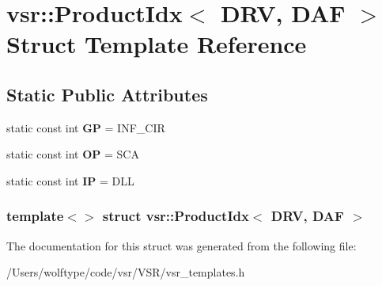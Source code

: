 \hypertarget{structvsr_1_1_product_idx_3_01_d_r_v_00_01_d_a_f_01_4}{\section{vsr\-:\-:Product\-Idx$<$ D\-R\-V, D\-A\-F $>$ Struct Template Reference}
\label{structvsr_1_1_product_idx_3_01_d_r_v_00_01_d_a_f_01_4}
}
\subsection*{Static Public Attributes}
\begin{DoxyCompactItemize}
\item 
\hypertarget{structvsr_1_1_product_idx_3_01_d_r_v_00_01_d_a_f_01_4_a6ec5d5bef01c3942c092f72db9c722e5}{static const int {\bfseries G\-P} = I\-N\-F\-\_\-\-C\-I\-R}\label{structvsr_1_1_product_idx_3_01_d_r_v_00_01_d_a_f_01_4_a6ec5d5bef01c3942c092f72db9c722e5}

\item 
\hypertarget{structvsr_1_1_product_idx_3_01_d_r_v_00_01_d_a_f_01_4_a71ebc8fe39d9648e8558bcc5af8de45a}{static const int {\bfseries O\-P} = S\-C\-A}\label{structvsr_1_1_product_idx_3_01_d_r_v_00_01_d_a_f_01_4_a71ebc8fe39d9648e8558bcc5af8de45a}

\item 
\hypertarget{structvsr_1_1_product_idx_3_01_d_r_v_00_01_d_a_f_01_4_a782bbc576b0133bc13f5c10e4575ae7e}{static const int {\bfseries I\-P} = D\-L\-L}\label{structvsr_1_1_product_idx_3_01_d_r_v_00_01_d_a_f_01_4_a782bbc576b0133bc13f5c10e4575ae7e}

\end{DoxyCompactItemize}
\subsubsection*{template$<$$>$ struct vsr\-::\-Product\-Idx$<$ D\-R\-V, D\-A\-F $>$}



The documentation for this struct was generated from the following file\-:\begin{DoxyCompactItemize}
\item 
/\-Users/wolftype/code/vsr/\-V\-S\-R/vsr\-\_\-templates.\-h\end{DoxyCompactItemize}
